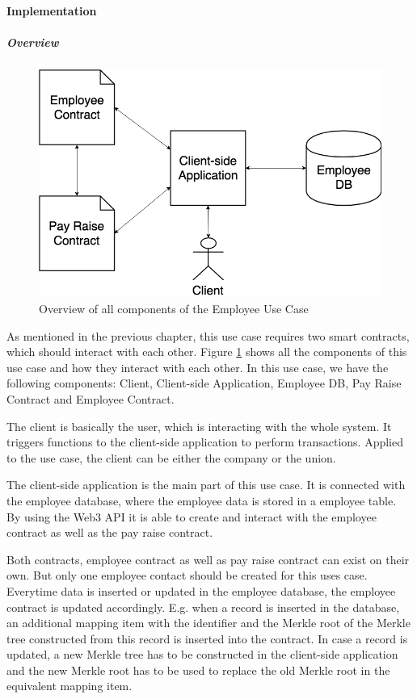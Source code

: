 \paragraph{Implementation}
\subparagraph{Overview}

\begin{figure}[h]%
\centering
\includegraphics[width=1.0\textwidth]{images/payraiseusecase.png}
\caption{\label{fig:payraiseusecase}Overview of all components of the Employee Use Case}
\end{figure}

As mentioned in the previous chapter, this use case requires two smart contracts, which should interact with each other. Figure \ref{fig:payraiseusecase} shows all the components of this use case and how they interact with each other. In this use case, we have the following components: Client, Client-side Application, Employee DB, Pay Raise Contract and Employee Contract.

The client is basically the user, which is interacting with the whole system. It triggers functions to the client-side application to perform transactions. Applied to the use case, the client can be either the company or the union.

The client-side application is the main part of this use case. It is connected with the employee database, where the employee data is stored in a employee table. By using the Web3 API it is able to create and interact with the employee contract as well as the pay raise contract.

Both contracts, employee contract as well as pay raise contract can exist on their own. But only one employee contact should be created for this uses case. Everytime data is inserted or updated in the employee database, the employee contract is updated accordingly. E.g. when a record is inserted in the database, an additional mapping item with the identifier and the Merkle root of the Merkle tree constructed from this record is inserted into the contract. In case a record is updated, a new Merkle tree has to be constructed in the client-side application and the new Merkle root has to be used to replace the old Merkle root in the equivalent mapping item.


